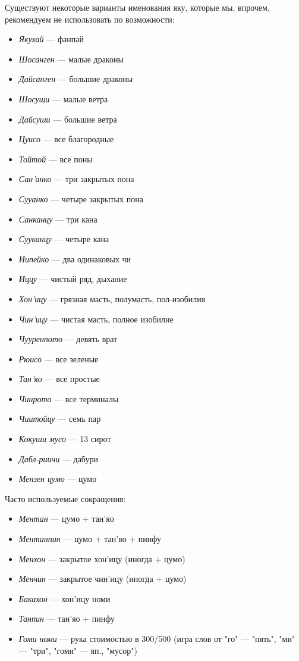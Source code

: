 Существуют некоторые варианты именования яку, которые мы, впрочем, рекомендуем не использовать по возможности:
\begin{itemize}
	\item \textit{Якухай} --- фанпай
	\item \textit{Шосанген} --- малые драконы
	\item \textit{Дайсанген} --- большие драконы
	\item \textit{Шосуши} --- малые ветра
	\item \textit{Дайсуши} --- большие ветра
	\item \textit{Цуисо} --- все благородные
	\item \textit{Тойтой} --- все поны
	\item \textit{Сан'анко} --- три закрытых пона
	\item \textit{Сууанко} --- четыре закрытых пона
	\item \textit{Санканцу} --- три кана
	\item \textit{Сууканцу} --- четыре кана
	\item \textit{Иипейко} --- два одинаковых чи
	\item \textit{Иццу} --- чистый ряд, дыхание
	\item \textit{Хон'ицу} --- грязная масть, полумасть, пол-изобилия
	\item \textit{Чин'ицу} --- чистая масть, полное изобилие
	\item \textit{Чууренпото} --- девять врат
	\item \textit{Рюисо} --- все зеленые
	\item \textit{Тан'яо} --- все простые
	\item \textit{Чинрото} --- все терминалы
	\item \textit{Чиитойцу} --- семь пар
	\item \textit{Кокуши мусо} --- 13 сирот
	\item \textit{Дабл-риичи} --- дабури
	\item \textit{Мензен цумо} --- цумо
\end{itemize}

Часто используемые сокращения:
\begin{itemize}
	\item \textit{Ментан} --- цумо + тан'яо
	\item \textit{Ментанпин} --- цумо + тан'яо + пинфу
	\item \textit{Менхон} --- закрытое хон'ицу (иногда + цумо)
	\item \textit{Менчин} --- закрытое чин'ицу (иногда + цумо)
	\item \textit{Бакахон} --- хон'ицу номи
	\item \textit{Танпин} --- тан'яо + пинфу
	\item \textit{Гоми номи} --- рука стоимостью в 300/500 (игра слов от "го" --- "пять", "ми" --- "три", "гоми" --- яп., "мусор")
\end{itemize}

